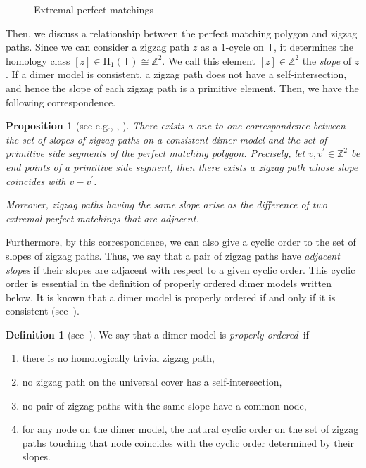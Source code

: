 \documentclass[11pt]{amsart}
\newtheorem{prop}[theo]{Proposition}
\theoremstyle{definition}
\newtheorem{defi}[theo]{Definition}
\newcommand{\rmH}{\mathrm{H}}
\newcommand{\ZZ}{\mathbb{Z}}
\newcommand{\sfT}{\mathsf{T}}
\begin{document}
\begin{figure}[H]
{{\begin{tikzpicture}
\end{tikzpicture}
}}
\caption{Extremal perfect matchings}
\label{pm_4a}
\end{figure}

Then, we discuss a relationship between the perfect matching polygon and zigzag paths. Since we can consider a zigzag path $z$ as a $1$-cycle on $\sfT$, it determines the homology class $[z]\in\rmH_1(\sfT)\cong\ZZ^2$. We call this element $[z]\in\ZZ^2$ the \emph{slope} of $z$. If a dimer model is consistent, a zigzag path does not have a self-intersection, and hence the slope of each zigzag path is a primitive element. Then, we have the following correspondence.

\begin{prop}[{see e.g., \cite[Section~9]{IU2}, \cite[Corollary~2.9]{Boc3}}]\label{zigzag_sidepolygon}
There exists a one to one correspondence between the set of slopes of zigzag paths on a consistent dimer model and the set of primitive side segments of the perfect matching polygon. Precisely, let $v,v^\prime\in\ZZ^2$ be end points of a primitive side segment, then there exists a zigzag path whose slope coincides with $v-v^\prime$.

Moreover, zigzag paths having the same slope arise as the difference of two extremal perfect matchings that are adjacent.
\end{prop}

Furthermore, by this correspondence, we can also give a cyclic order to the set of slopes of zigzag paths. Thus, we say that a pair of zigzag paths have \emph{adjacent slopes} if their slopes are adjacent with respect to a given cyclic order. This cyclic order is essential in the definition of properly ordered dimer models written below. It is known that a dimer model is properly ordered if and only if it is consistent (see~\cite[Proposition~4.4]{IU1}).

\begin{defi}[{see~\cite[Section~3.1]{Gul}}]\label{def_properly}
We say that a dimer model is \emph{properly ordered}~if
\begin{enumerate}%
\item there is no homologically trivial zigzag path,
\item no zigzag path on the universal cover has a self-intersection,
\item no pair of zigzag paths with the same slope have a common node,
\item for any node on the dimer model, the natural cyclic order on the set of zigzag paths touching that node coincides with the cyclic order determined by their slopes.
\end{enumerate}
\end{defi}
\end{document}
